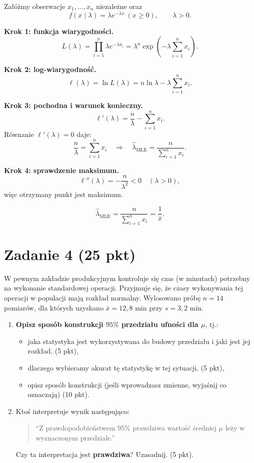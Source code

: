 \documentclass[polish, 10pt]{extarticle}
\begin{document}
\begin{enumerate}
Załóżmy obserwacje $x_1,\dots,x_n$ niezależne oraz
\[
f(x\mid \lambda)=\lambda e^{-\lambda x}\ (x\ge 0),\qquad \lambda>0.
\]

\textbf{Krok 1: funkcja wiarygodności.}
\[
L(\lambda)=\prod_{i=1}^n \lambda e^{-\lambda x_i}
=\lambda^n \exp\!\left(-\lambda\sum_{i=1}^n x_i\right).
\]

\textbf{Krok 2: log-wiarygodność.}
\[
\ell(\lambda)=\ln L(\lambda)=n\ln\lambda-\lambda\sum_{i=1}^n x_i.
\]

\textbf{Krok 3: pochodna i warunek konieczny.}
\[
\ell'(\lambda)=\frac{n}{\lambda}-\sum_{i=1}^n x_i.
\]
Równanie $\ell'(\lambda)=0$ daje:
\[
\frac{n}{\lambda}=\sum_{i=1}^n x_i
\quad\Longrightarrow\quad
\hat\lambda_{\mathrm{MLE}}=\frac{n}{\sum_{i=1}^n x_i}.
\]

\textbf{Krok 4: sprawdzenie maksimum.}
\[
\ell''(\lambda)=-\frac{n}{\lambda^2}<0\quad (\lambda>0),
\]
więc otrzymany punkt jest maksimum.

\[
\boxed{\hat\lambda_{\mathrm{MLE}}=\dfrac{n}{\sum_{i=1}^n x_i}=\dfrac{1}{\bar x}.}
\]

\end{enumerate}

\section*{Zadanie 4 (25 pkt)}
W pewnym zakładzie produkcyjnym kontroluje się czas (w minutach) potrzebny na wykonanie standardowej operacji. Przyjmuje się, że czasy wykonywania tej operacji w populacji mają rozkład normalny. Wylosowano próbę \textbf{$n = 14$} pomiarów, dla których uzyskano $\bar{x} = 12{,}8$ min przy $s = 3{,}2$ min.

\begin{enumerate}
    \item \textbf{Opisz sposób konstrukcji $95\%$ przedziału ufności dla $\mu$}, tj.:
    \begin{itemize}
        \item jaka statystyka jest wykorzystywana do budowy przedziału i jaki jest jej rozkład, \hfill (5 pkt),
        \item dlaczego wybieramy akurat tę statystykę w tej sytuacji, \hfill (5 pkt),
        \item opisz sposób konstrukcji (jeśli wprowadzasz zmienne, wyjaśnij  co oznaczają) \hfill (10 pkt).
    \end{itemize}

    \item Ktoś interpretuje wynik następująco:
    \begin{quote}
    ``Z prawdopodobieństwem $95\%$ prawdziwa wartość średniej $\mu$ leży w wyznaczonym przedziale.''
    \end{quote}
    Czy ta interpretacja jest \textbf{prawdziwa}? Uzasadnij. \hfill (5 pkt).
\end{enumerate}
\end{document}
